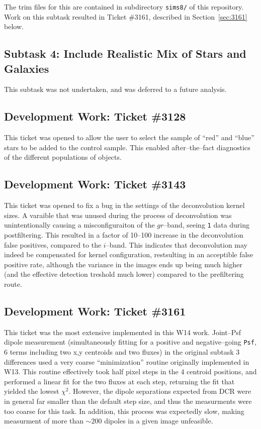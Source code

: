 \documentclass[prd, nofootinbib, floatfix, 11pt, tightenlines, times]{article}
\begin{document}
The trim files for this are
contained in subdirectory {\tt sims8/} of this repository.  Work on this subtask resulted in Ticket \#3161, described in
Section~\ref{sec:3161} below.

\subsection{Subtask 4: Include Realistic Mix of Stars and Galaxies}

This subtask was not undertaken, and was deferred to a future analysis.

\subsection{Development Work: Ticket \#3128 \label{sec:3128}}

This ticket was opened to allow the user to select the sample of
``red'' and ``blue'' stars to be added to the control sample.  This
enabled after--the--fact diagnostics of the different populations of
objects.

\subsection{Development Work: Ticket \#3143 \label{sec:3143}}

This ticket was opened to fix a bug in the settings of the
deconvolution kernel sizes.  A varaible that was unused during the
process of deconvolution was unintentionally causing a
misconfiguraiton of the $gr$--band, seeing {\tt 1} data during
postfiltering.  This resulted in a factor of 10--100 increase in the
deconvolution false positives, compared to the $i$--band.  This
indicates that deconvolution may indeed be compensated for kernel
configuration, restsulting in an acceptible false positive rate,
although the variance in the images ends up being much higher (and the
effective detection treshold much lower) compared to the prefiltering
route.

\subsection{Development Work: Ticket \#3161 \label{sec:3161}}

This ticket was the most extensive implemented in this W14 work.
Joint--Psf dipole measurement (simultaneously fitting for a positive
and negative--going {\tt Psf}, 6 terms including two x,y centroids and
two fluxes) in the original subtask 3 differences used a very coarse
``minimization'' routine originally implemented in W13.  This routine
effectively took half pixel steps in the 4 centroid positions, and
performed a linear fit for the two fluxes at each step, returning the
fit that yielded the lowest $\chi^2$.  However, the dipole separations
expected from DCR were in general far smaller than the default step
size, and thus the measurments were too coarse for this task.  In
addition, this process was expectedly slow, making measurment of more
than $\sim 200$ dipoles in a given image unfeasible.
\end{document}
